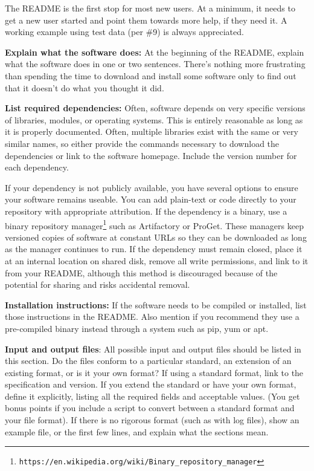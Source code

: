 \documentclass[10pt]{article}
\newcommand{\withurl}[2]{{#1}\footnote{\texttt{#2}}}
\begin{document}
The README is the first stop for most new users.
At a minimum, it needs to get a new user started and point them towards more
help, if they need it.
A working example using test data (per
\#9) is always appreciated.

\textbf{Explain what the software does:} At the beginning of the README,
explain what the software does in one or two sentences.
There's nothing more frustrating
than spending the time to download and install some software only to
find out that it doesn't do what you thought it did.

\textbf{List required dependencies:} Often, software depends on very
specific versions of libraries, modules, or operating systems. This is
entirely reasonable as long as it is properly documented. Often,
multiple libraries exist with the same or very similar names, so
either provide the commands necessary to download the dependencies or
link to the software homepage. Include the version number for each
dependency.  

If your dependency is not publicly available,
you have several options to ensure your software remains useable.
You can add plain-text or code directly to
your repository with appropriate attribution. If the dependency is a binary, use a
\withurl{binary repository manager}{https://en.wikipedia.org/wiki/Binary\_repository\_manager}
such as Artifactory or ProGet. These managers keep versioned copies of
software at constant URLs so they can be downloaded as long as the
manager continues to run. If the dependency must remain closed, place it at an
internal location on shared disk, remove all write permissions, and
link to it from your README, although this method is 
discouraged because of the potential for sharing and risks accidental removal.

\textbf{Installation instructions:} If the software needs to be compiled
or installed, list those instructions in the README. Also
mention if you recommend they use a pre-compiled binary instead
through a system such as pip, yum or apt.

\textbf{Input and output files}: All possible input and output files
should be listed in this section. Do the files conform to a particular
standard, an extension of an existing format, or is it your own
format? If using a standard format, link to the specification and
version. If you extend the standard or have your own format, define it
explicitly, listing all the required fields and acceptable values.
(You get bonus points if you include a script to convert between
a standard format and your file format). If there is no rigorous format
(such as with log files), show an example file, or the first few lines,
and explain what the sections mean.
\end{document}

